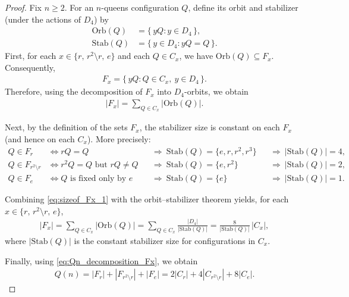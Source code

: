 \documentclass[pdflatex,sn-mathphys-num]{sn-jnl}
\theoremstyle{thmstyleone}
\theoremstyle{thmstyletwo}
\theoremstyle{thmstylethree}
\begin{document}
\begin{proof}
Fix $n \geq 2$. For an $n$-queens configuration $Q$, define its orbit and stabilizer (under the actions of $D_4$) by
\begin{align}
    \mathrm{Orb}(Q)  &= \{\, yQ : y \in D_4 \,\},\\
    \mathrm{Stab}(Q) &= \{\, y \in D_4 : yQ = Q \,\}.
\end{align}
First, for each $x \in \{r,\, r^2 \setminus r,\, e\}$ and each $Q \in C_x$, we have $\mathrm{Orb}(Q) \subseteq F_x$. 
Consequently,
\begin{align}
    F_x = \{\, yQ : Q \in C_x,\ y \in D_4 \,\}.
\end{align}
Therefore, using the decomposition of $F_x$ into $D_4$-orbits, we obtain
\begin{align}\label{eq:sizeof_Fx_1}
    |F_x| = \sum_{Q \in C_x} |\mathrm{Orb}(Q)|.
\end{align}

Next, by the definition of the sets $F_x$, the stabilizer size is constant on each $F_x$ (and hence on each $C_x$). More precisely:
\begin{align}
    Q \in F_r
    &\iff rQ = Q
    &&\Rightarrow\ \mathrm{Stab}(Q) = \{e, r, r^2, r^3\}
    &&\Rightarrow\ |\mathrm{Stab}(Q)| = 4, \\
    Q \in F_{r^2 \setminus r}
    &\iff r^2Q = Q \text{ but } rQ \neq Q
    &&\Rightarrow\ \mathrm{Stab}(Q) = \{e, r^2\}
    &&\Rightarrow\ |\mathrm{Stab}(Q)| = 2, \\
    Q \in F_e
    &\iff \text{$Q$ is fixed only by $e$}
    &&\Rightarrow\ \mathrm{Stab}(Q) = \{e\}
    &&\Rightarrow\ |\mathrm{Stab}(Q)| = 1.
\end{align}

Combining \eqref{eq:sizeof_Fx_1} with the orbit--stabilizer theorem yields, for each $x \in \{r,\, r^2 \setminus r,\, e\}$,
\begin{align}
    |F_x|
    = \sum_{Q \in C_x} |\mathrm{Orb}(Q)|
    = \sum_{Q \in C_x} \frac{|D_4|}{|\mathrm{Stab}(Q)|}
    = \frac{8}{|\mathrm{Stab}(Q)|}\,|C_x|,
\end{align}
where $|\mathrm{Stab}(Q)|$ is the constant stabilizer size for configurations in $C_x$.

Finally, using \eqref{eq:Qn_decomposition_Fx}, we obtain
\begin{align}
    Q(n)
    = |F_r| + |F_{r^2 \setminus r}| + |F_e|
    = 2|C_r| + 4|C_{r^2 \setminus r}| + 8|C_e|.
\end{align}
\end{proof}
\end{document}
